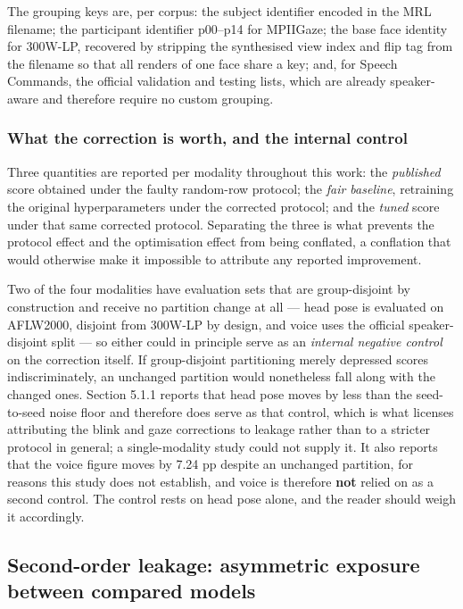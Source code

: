 The grouping keys are, per corpus: the subject identifier encoded in the MRL filename; the participant identifier p00--p14 for MPIIGaze; the base face identity for 300W-LP, recovered by stripping the synthesised view index and flip tag from the filename so that all renders of one face share a key; and, for Speech Commands, the official validation and testing lists, which are already speaker-aware and therefore require no custom grouping.

\subsubsection{What the correction is worth, and the internal control}

Three quantities are reported per modality throughout this work: the \emph{published} score obtained under the faulty random-row protocol; the \emph{fair baseline}, retraining the original hyperparameters under the corrected protocol; and the \emph{tuned} score under that same corrected protocol. Separating the three is what prevents the protocol effect and the optimisation effect from being conflated, a conflation that would otherwise make it impossible to attribute any reported improvement.

Two of the four modalities have evaluation sets that are group-disjoint by construction and receive no partition change at all --- head pose is evaluated on AFLW2000, disjoint from 300W-LP by design, and voice uses the official speaker-disjoint split --- so either could in principle serve as an \emph{internal negative control} on the correction itself. If group-disjoint partitioning merely depressed scores indiscriminately, an unchanged partition would nonetheless fall along with the changed ones. Section 5.1.1 reports that head pose moves by less than the seed-to-seed noise floor and therefore does serve as that control, which is what licenses attributing the blink and gaze corrections to leakage rather than to a stricter protocol in general; a single-modality study could not supply it. It also reports that the voice figure moves by 7.24 pp despite an unchanged partition, for reasons this study does not establish, and voice is therefore \textbf{not} relied on as a second control. The control rests on head pose alone, and the reader should weigh it accordingly.

\FloatBarrier

\subsection{Second-order leakage: asymmetric exposure between compared models}

